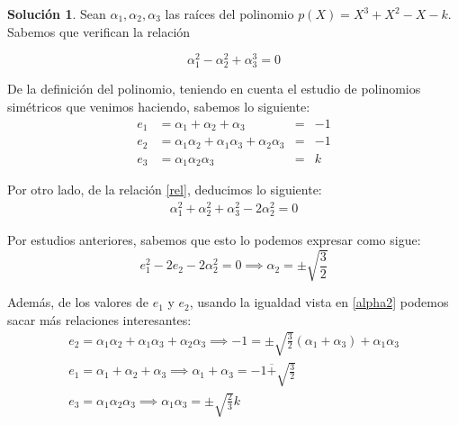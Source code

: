 \documentclass[a4paper, 11pt]{article}
\theoremstyle{definition}
\newtheorem*{solucion}{Solución}
\theoremstyle{remark}
\begin{document}
  \begin{solucion}
      Sean $\alpha_1, \alpha_2, \alpha_3$ las raíces del polinomio $p(X)=X^3+X^2-X-k$. Sabemos que verifican la relación

      \begin{equation} \label{rel}
          \alpha_1^2-\alpha_2^2+\alpha_3^3 = 0
      \end{equation}

      De la definición del polinomio, teniendo en cuenta el estudio de polinomios simétricos que venimos haciendo, sabemos lo siguiente:
      \begin{align*}
          e_1 &= \alpha_1+\alpha_2+\alpha_3 &=& -1 \\
          e_2 &= \alpha_1\alpha_2 + \alpha_1\alpha_3 + \alpha_2\alpha_3 &=& -1 \\
          e_3 &= \alpha_1\alpha_2\alpha_3 &=& k
      \end{align*}

      Por otro lado, de la relación \ref{rel}, deducimos lo siguiente:
      \begin{align*}
          \alpha_1^2+\alpha_2^2+\alpha_3^2 - 2\alpha_2^2 = 0
      \end{align*}

      Por estudios anteriores, sabemos que esto lo podemos expresar como sigue:
      \begin{equation} \label{alpha2}
        e_1^2-2e_2 - 2\alpha_2^2 = 0 \implies \boxed{\alpha_2 = \pm\sqrt{\frac{3}{2}}}
      \end{equation}

      Además, de los valores de $e_1$ y $e_2$, usando la igualdad vista en \ref{alpha2} podemos sacar más relaciones interesantes:
      \begin{align}
          e_2 = \alpha_1\alpha_2 + \alpha_1\alpha_3 + \alpha_2\alpha_3 \implies \boxed{-1 = \pm\sqrt{\frac{3}{2}}(\alpha_1+\alpha_3)+\alpha_1\alpha_3} \label{total}\\
          e_1 = \alpha_1 + \alpha_2 + \alpha_3 \implies \boxed{\alpha_1 + \alpha_3 = -1 \overline{+}\sqrt{\frac{3}{2}}} \label{suma}\\
          e_3 = \alpha_1\alpha_2\alpha_3 \implies \boxed{\alpha_1\alpha_3 = \pm\sqrt{\frac{2}{3}}k}\label{producto}
      \end{align}


\end{solucion}
\end{document}
